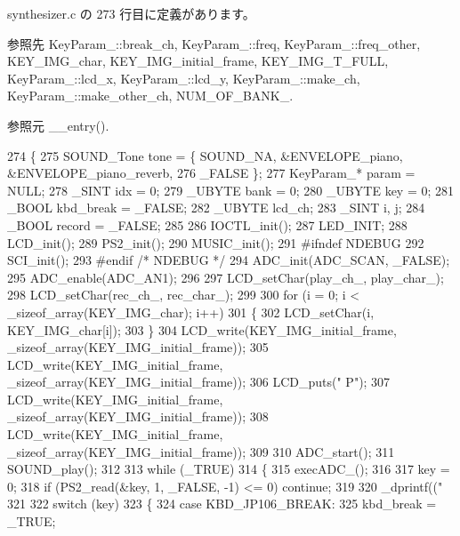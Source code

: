  synthesizer.\+c の 273 行目に定義があります。



参照先 Key\+Param\+\_\+\+::break\+\_\+ch, Key\+Param\+\_\+\+::freq, Key\+Param\+\_\+\+::freq\+\_\+other, K\+E\+Y\+\_\+\+I\+M\+G\+\_\+char, K\+E\+Y\+\_\+\+I\+M\+G\+\_\+initial\+\_\+frame, K\+E\+Y\+\_\+\+I\+M\+G\+\_\+\+T\+\_\+\+F\+U\+L\+L, Key\+Param\+\_\+\+::lcd\+\_\+x, Key\+Param\+\_\+\+::lcd\+\_\+y, Key\+Param\+\_\+\+::make\+\_\+ch, Key\+Param\+\_\+\+::make\+\_\+other\+\_\+ch, N\+U\+M\+\_\+\+O\+F\+\_\+\+B\+A\+N\+K\+\_\+.



参照元 \+\_\+\+\_\+entry().


\begin{DoxyCode}
274 \{
275     SOUND\_Tone tone = \{ SOUND\_NA, &ENVELOPE\_piano, &ENVELOPE\_piano\_reverb,
276                         \_FALSE \};
277     KeyParam_* param = NULL;
278     \_SINT idx = 0;
279     \_UBYTE bank = 0;
280     \_UBYTE key = 0;
281     \_BOOL kbd\_break = \_FALSE;
282     \_UBYTE lcd\_ch;
283     \_SINT i, j;
284     \_BOOL record = \_FALSE;
285 
286     IOCTL\_init();
287     LED\_INIT;
288     LCD\_init();
289     PS2\_init();
290     MUSIC\_init();
291 \textcolor{preprocessor}{#ifndef NDEBUG
}
292     SCI\_init();
293 \textcolor{preprocessor}{#endif }\textcolor{comment}{/* NDEBUG */}\textcolor{preprocessor}{}
294     ADC\_init(ADC\_SCAN, \_FALSE);
295     ADC\_enable(ADC\_AN1);
296 
297     LCD\_setChar(play\_ch\_, play\_char\_);
298     LCD\_setChar(rec\_ch\_, rec\_char\_);
299 
300     \textcolor{keywordflow}{for} (i = 0; i < \_sizeof\_array(KEY_IMG_char); i++)
301     \{
302         LCD\_setChar(i, KEY_IMG_char[i]);
303     \}
304     LCD\_write(KEY_IMG_initial_frame, \_sizeof\_array(KEY_IMG_initial_frame));
305     LCD\_write(KEY_IMG_initial_frame, \_sizeof\_array(KEY_IMG_initial_frame));
306     LCD\_puts(\textcolor{stringliteral}{" P"});
307     LCD\_write(KEY_IMG_initial_frame, \_sizeof\_array(KEY_IMG_initial_frame));
308     LCD\_write(KEY_IMG_initial_frame, \_sizeof\_array(KEY_IMG_initial_frame));
309 
310     ADC\_start();
311     SOUND\_play();
312 
313     \textcolor{keywordflow}{while} (\_TRUE)
314     \{
315         execADC\_();
316 
317         key = 0;
318         \textcolor{keywordflow}{if} (PS2\_read(&key, 1, \_FALSE, -1) <= 0) \textcolor{keywordflow}{continue};
319 
320         \_dprintf((\textcolor{stringliteral}{"%
321 
322         \textcolor{keywordflow}{switch} (key)
323         \{
324         \textcolor{keywordflow}{case} KBD\_JP106\_BREAK:
325             kbd\_break = \_TRUE;
}
\end{DoxyCode}
